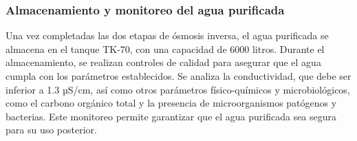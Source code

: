 \subsubsection{Almacenamiento y monitoreo del agua purificada}

Una vez completadas las dos etapas de ósmosis inversa, el agua purificada se almacena en el tanque TK-70, con una capacidad de 6000 litros. Durante el almacenamiento, se realizan controles de calidad para asegurar que el agua cumpla con los parámetros establecidos. Se analiza la conductividad, que debe ser inferior a 1.3 µS/cm, así como otros parámetros físico-químicos y microbiológicos, como el carbono orgánico total y la presencia de microorganismos patógenos y bacterias. Este monitoreo permite garantizar que el agua purificada sea segura para su uso posterior.